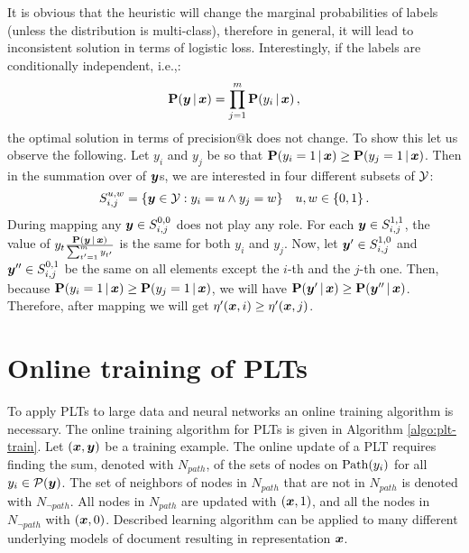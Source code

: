 \documentclass{article}
\newcommand{\prob}{\mathbf{P}}
\newcommand{\sectionBefore}{-0pt}
\newcommand{\sectionAfter}{-0pt}
\begin{document}
It is obvious that the heuristic will change the marginal probabilities of labels (unless the distribution is multi-class), therefore in general, it will lead to inconsistent solution in terms of logistic loss. 
Interestingly, if the labels are conditionally independent, i.e.,:
$$
\prob(\by \given \bx) = \prod_{j=1}^m \prob(y_i \given \bx)\,,
$$
the optimal solution in terms of precision@k does not change. To show this let us observe the following.
Let $y_i$ and $y_j$ be so that $\prob(y_i = 1 \given \bx) \ge \prob(y_j = 1 \given \bx) $. Then in the summation over of $\boldsymbol{y}$s, we are interested in four different subsets of $\mathcal{Y}$: 
$$
S_{i,j}^{u,w}  =  \{\boldsymbol{y}\in \mathcal{Y}: y_i = u \land y_j = w\} \quad u,w \in \{0,1\} \,.
$$
During mapping any $\boldsymbol{y} \in S^{0,0}_{i,j}$ does not play any role. For each $\boldsymbol{y} \in S^{1,1}_{i,j}$, the value of $y_t \frac{\prob(\by \given \bx)}{\sum_{t'=1}^m y_{t'}}$ is the same for both $y_i$ and $y_j$. Now, let $\boldsymbol{y}' \in S^{1,0}_{i,j}$ and $\boldsymbol{y}'' \in S^{0,1}_{i,j}$ be the same on all elements except the $i$-th and the $j$-th one. Then, because   $\prob(y_i = 1 \given \bx) \ge \prob(y_j = 1 \given \bx) $, we will have $\prob(\by' \given \bx) \ge \prob(\by'' \given \bx)$. Therefore, after mapping we will get $\eta'(\boldsymbol{x},i) \ge \eta'(\boldsymbol{x}, j)$. 


%
%
%


\vspace{\sectionBefore}
\section{Online training of PLTs}
\label{sec:online_PLTs}
\vspace{\sectionAfter}




To apply PLTs to large data and neural networks an online training algorithm is necessary.
The online training algorithm for PLTs is given in Algorithm \ref{algo:plt-train}. 
Let $(\boldsymbol{x}, \boldsymbol{y})$ be a training example. The online update of a PLT requires finding the sum, denoted with  $N_{path}$, of the sets of nodes on $\mathrm{Path}(y_i)$ for all $y_i \in \mathcal{P}(\boldsymbol{y})$. The set of neighbors of nodes in $N_{path}$ that are not in $N_{path}$ is denoted with $N_{\lnot path}$. All nodes in $N_{path}$ are updated with $(\boldsymbol{x}, 1)$, and all the nodes in $N_{\lnot path}$ with $(\boldsymbol{x}, 0)$. Described learning algorithm can be applied to many different underlying models of document resulting in representation $\boldsymbol{x}$.
\end{document}
